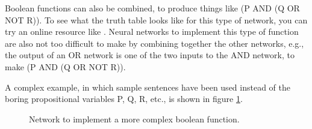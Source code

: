 Boolean functions can also be combined, to produce things like (P AND (Q OR NOT R)). To see what the truth table looks like for this type of network, you can try an online resource like . Neural networks to implement this type of function are also not too difficult to make by combining together the other networks, e.g., the output of an OR network is one of the two inputs to the AND network, to make (P AND (Q OR NOT R)).

A complex example, in which sample sentences have been used instead of the boring propositional variables P, Q, R, etc., is shown in figure \ref{logic_gates_ex}.

\begin{figure}[h]
\centering
{}
\caption[Simbrain screenshot]{Network to implement a more complex boolean function.}
\label{logic_gates_ex}
\end{figure}
